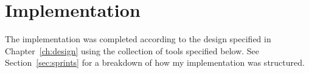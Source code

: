 \chapter{Implementation}

The implementation was completed according to the design specified in Chapter~\ref{ch:design} using the collection of tools specified below. See Section~\ref{sec:sprints} for a breakdown of how my implementation was structured.


